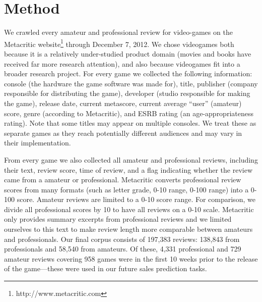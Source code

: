 \documentclass{sig-alternate}
\begin{document}
\section{Method}

We crawled every amateur and professional review for video-games on the
Metacritic website\footnote{http://www.metacritic.com} through December
7, 2012. We chose videogames both because it is a relatively
under-studied product domain (movies and books have received far more
research attention), and also because videogames fit into a broader
research project. 
For every game we collected the following information: console (the
hardware the game software was made for), title, publisher (company
responsible for distributing the game), developer (studio responsible
for making the game), release date, current metascore, current average
``user'' (amateur) score, genre (according to Metacritic), and ESRB
rating (an age-appropriateness rating). Note that some titles may appear on multiple consoles. We treat these as separate games as they reach potentially different audiences and may vary in their implementation. 

From every game we also collected all amateur and professional reviews,
including their text, review score, time of review, and a flag
indicating whether the review came from a amateur or professional.
Metacritic converts professional review scores from many formats (such
as letter grade, 0-10 range, 0-100 range) into a 0-100 score. Amateur
reviews are limited to a 0-10 score range. For comparison, we divide all professional scores by 10 to have all reviews on a 0-10 scale. Metacritic only provides summary excerpts from professional reviews and we limited ourselves to this text to make review length more comparable between amateurs and professionals. Our final corpus consists of 197,383 reviews: 138,843 from professionals and 58,540 from amateurs. Of these, 4,331 professional and 729 amateur reviews covering 958 games were in the first 10 weeks prior to the release of the game---these were used in our future sales prediction tasks.
\end{document}
